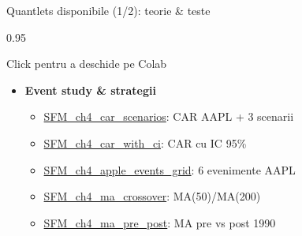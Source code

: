 \documentclass[9pt, aspectratio=169, t]{beamer}
\begin{document}
\begin{frame}[shrink=15]{Quantlets disponibile (1/2): teorie \& teste}
\begin{cminipage}{0.95\textwidth}
\begin{block}{Click pentru a deschide pe Colab}
\begin{itemize}
\begin{itemize}
    \end{itemize}
    \item \textbf{Event study \& strategii}
    \begin{itemize}\setlength{\itemsep}{0pt}
        \item \href{https://colab.research.google.com/github/QuantLet/Stat_fin_markets/blob/master/Ch_04/SFM_ch4_car_scenarios/SFM_ch4_car_scenarios.ipynb}{SFM\_ch4\_car\_scenarios}: CAR AAPL + 3 scenarii
        \item \href{https://colab.research.google.com/github/QuantLet/Stat_fin_markets/blob/master/Ch_04/SFM_ch4_car_with_ci/SFM_ch4_car_with_ci.ipynb}{SFM\_ch4\_car\_with\_ci}: CAR cu IC 95\%
        \item \href{https://colab.research.google.com/github/QuantLet/Stat_fin_markets/blob/master/Ch_04/SFM_ch4_apple_events_grid/SFM_ch4_apple_events_grid.ipynb}{SFM\_ch4\_apple\_events\_grid}: 6 evenimente AAPL
        \item \href{https://colab.research.google.com/github/QuantLet/Stat_fin_markets/blob/master/Ch_04/SFM_ch4_ma_crossover/SFM_ch4_ma_crossover.ipynb}{SFM\_ch4\_ma\_crossover}: MA(50)/MA(200)
        \item \href{https://colab.research.google.com/github/QuantLet/Stat_fin_markets/blob/master/Ch_04/SFM_ch4_ma_pre_post/SFM_ch4_ma_pre_post.ipynb}{SFM\_ch4\_ma\_pre\_post}: MA pre vs post 1990
    \end{itemize}
\end{itemize}
\end{block}
\end{cminipage}
\end{frame}
\end{document}
